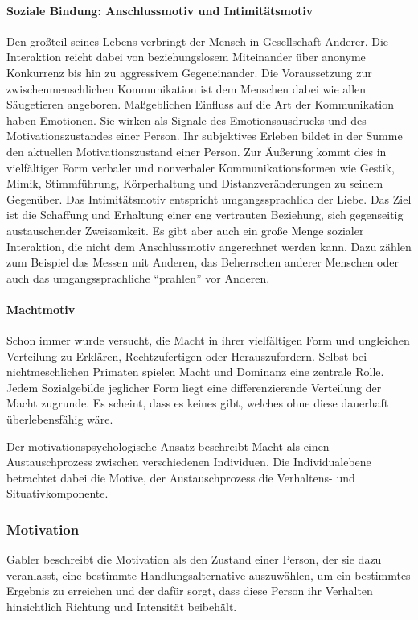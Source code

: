 \paragraph{Soziale Bindung: Anschlussmotiv und Intimitätsmotiv}
Den großteil seines Lebens verbringt der Mensch in Gesellschaft Anderer. Die Interaktion reicht dabei von beziehungslosem Miteinander über anonyme Konkurrenz bis hin zu aggressivem Gegeneinander. Die Voraussetzung zur zwischenmenschlichen Kommunikation ist dem Menschen dabei wie allen Säugetieren angeboren. Maßgeblichen Einfluss auf die Art der Kommunikation haben Emotionen. Sie wirken als Signale des Emotionsausdrucks und des Motivationszustandes einer Person. Ihr subjektives Erleben bildet in der Summe den aktuellen Motivationszustand einer Person. Zur Äußerung kommt dies in vielfältiger Form verbaler und nonverbaler Kommunikationsformen wie Gestik, Mimik, Stimmführung, Körperhaltung und Distanzveränderungen zu seinem Gegenüber.
Das Intimitätsmotiv entspricht umgangssprachlich der \glqq Liebe\grqq. Das Ziel ist die Schaffung und Erhaltung einer eng vertrauten Beziehung, sich gegenseitig austauschender Zweisamkeit.
Es gibt aber auch ein große Menge sozialer Interaktion, die nicht dem Anschlussmotiv angerechnet werden kann. Dazu zählen zum Beispiel das Messen mit Anderen, das Beherrschen anderer Menschen oder auch das umgangssprachliche “prahlen” vor Anderen. \citep[S. 193f]{Sokolowski.2010}

\paragraph{Machtmotiv}
Schon immer wurde versucht, die Macht in ihrer vielfältigen Form und ungleichen Verteilung zu Erklären, Rechtzufertigen oder Herauszufordern. Selbst bei nichtmeschlichen Primaten spielen Macht und Dominanz eine zentrale Rolle. Jedem Sozialgebilde jeglicher Form liegt eine differenzierende Verteilung der Macht zugrunde. Es scheint, dass es keines gibt, welches ohne diese dauerhaft überlebensfähig wäre. \citep[S. 211]{Schmalt.2010}

Der motivationspsychologische Ansatz beschreibt Macht als einen Austauschprozess zwischen verschiedenen Individuen. Die Individualebene betrachtet dabei die Motive, der Austauschprozess die Verhaltens- und Situativkomponente. \citep[S. 211f]{Schmalt.2010}

\subsubsection{Motivation}
Gabler beschreibt die Motivation als den \glqq Zustand einer Person, der sie dazu veranlasst, eine bestimmte Handlungsalternative auszuwählen, um ein bestimmtes Ergebnis zu erreichen und der dafür sorgt, dass diese Person ihr Verhalten hinsichtlich Richtung und Intensität beibehält\grqq. \citep{GablerMotivation.2014}


